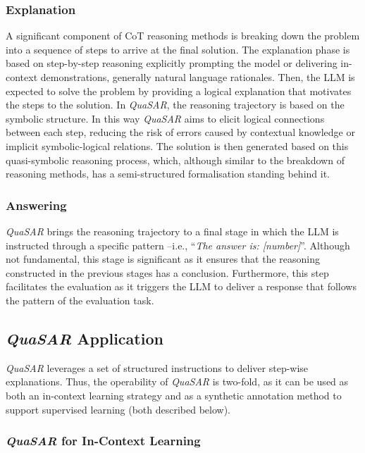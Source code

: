\documentclass[11pt]{article}
\newcommand{\QuaSAR}{\emph{QuaSAR}\xspace}
\begin{document}
\subsubsection{Explanation}
\label{sec:Explaination}
A significant component of CoT reasoning methods is breaking down the problem into a sequence of steps to arrive at the final solution.
The explanation phase is based on step-by-step reasoning \cite{kojima2022large} explicitly prompting the model or delivering in-context demonstrations, generally natural language rationales.
Then, the LLM is expected to solve the problem by providing a logical explanation that motivates the steps to the solution. In \QuaSAR, the reasoning trajectory is based on the symbolic structure. In this way \QuaSAR aims to elicit logical connections between each step, reducing the risk of errors caused by contextual knowledge or implicit symbolic-logical relations. The solution is then generated based on this quasi-symbolic reasoning process, which, although similar to the breakdown of reasoning methods, has a semi-structured formalisation standing behind it.



\subsubsection{Answering}
\label{sec:Answering}

\QuaSAR brings the reasoning trajectory to a final stage in which the LLM is instructed through a specific pattern --i.e.,  ``\textit{The answer is: [number]}''. Although not fundamental, this stage is significant as it ensures that the reasoning constructed in the previous stages has a conclusion. Furthermore, this step facilitates the evaluation as it triggers the LLM to deliver a response that follows the pattern of the evaluation task.

\subsection{\QuaSAR Application}
\label{sec:SiC_Application}

\QuaSAR leverages a set of structured instructions to deliver step-wise explanations. Thus, the operability of \QuaSAR is two-fold, as it can be used as both an in-context learning strategy and as a synthetic annotation method to support supervised learning (both described below). 

\subsubsection{\QuaSAR for In-Context Learning}
\label{sec:in-context}
\end{document}
